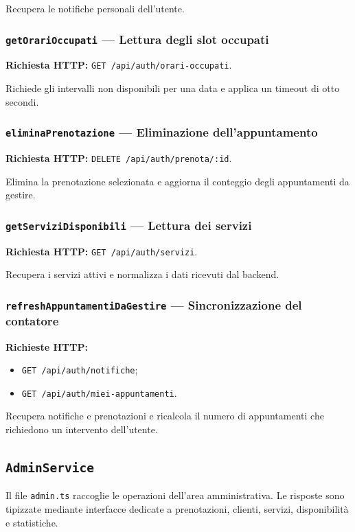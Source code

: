 \documentclass[12pt,a4paper]{article}
\begin{document}
Recupera le notifiche personali dell'utente.

\subsubsection{\texttt{getOrariOccupati} --- Lettura degli slot occupati}
\textbf{Richiesta HTTP:} \texttt{GET /api/auth/orari-occupati}.

Richiede gli intervalli non disponibili per una data e applica un timeout di
otto secondi.

\subsubsection{\texttt{eliminaPrenotazione} --- Eliminazione dell'appuntamento}
\textbf{Richiesta HTTP:} \texttt{DELETE /api/auth/prenota/:id}.

Elimina la prenotazione selezionata e aggiorna il conteggio degli appuntamenti
da gestire.

\subsubsection{\texttt{getServiziDisponibili} --- Lettura dei servizi}
\textbf{Richiesta HTTP:} \texttt{GET /api/auth/servizi}.

Recupera i servizi attivi e normalizza i dati ricevuti dal backend.

\subsubsection{\texttt{refreshAppuntamentiDaGestire} --- Sincronizzazione del contatore}
\textbf{Richieste HTTP:}
\begin{itemize}
    \item \texttt{GET /api/auth/notifiche};
    \item \texttt{GET /api/auth/miei-appuntamenti}.
\end{itemize}

Recupera notifiche e prenotazioni e ricalcola il numero di appuntamenti che
richiedono un intervento dell'utente.

\subsection{\texttt{AdminService}}
Il file \texttt{admin.ts} raccoglie le operazioni dell'area amministrativa.
Le risposte sono tipizzate mediante interfacce dedicate a prenotazioni,
clienti, servizi, disponibilità e statistiche.
\end{document}
